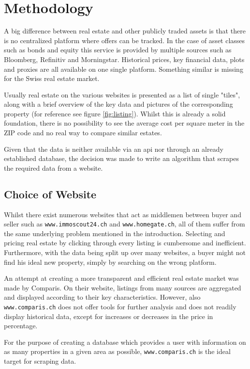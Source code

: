 \documentclass[main]{subfiles}
\begin{document}
\section{Methodology}
A big difference between real estate and other publicly traded assets is that there is no centralized platform where offers can be tracked. 
In the case of asset classes such as bonds and equity this service is provided by multiple sources such as Bloomberg, Refinitiv and Morningstar.
Historical prices, key financial data, plots and proxies are all available on one single platform.
Something similar is missing for the Swiss real estate market. 

Usually real estate on the various websites is presented as a list of single "tiles",
along with a brief overview of the key data and pictures of the corresponding property (for reference see figure \ref{fig:listing}).
Whilst this is already a solid foundation, 
there is no possibility to see the average cost per square meter in the ZIP code and no real way to compare similar estates.

Given that the data is neither available via an \acs*{api} nor through an already established database,
the decision was made to write an algorithm that scrapes the required data from a website.

\subsection{Choice of Website}

Whilst there exist numerous websites that act as middlemen between buyer and seller such as \verb|www.immoscout24.ch| and \verb|www.homegate.ch|,
all of them suffer from the same underlying problem mentioned in the introduction. 
Selecting and pricing real estate by clicking through every listing is cumbersome and inefficient.
Furthermore, with the data being split up over many websites, 
a buyer might not find his ideal new property, simply by searching on the wrong platform.

An attempt at creating a more transparent and efficient real estate market was made by Comparis. 
On their website, listings from many sources are aggregated and displayed according to their key characteristics.
However, also \verb|www.comparis.ch| does not offer tools for further analysis and does not readily display historical data,
except for increases or decreases in the price in percentage.

For the purpose of creating a database which provides a user with information on as many properties in a given area as possible, 
\verb|www.comparis.ch| is the ideal target for scraping data.
\end{document}
